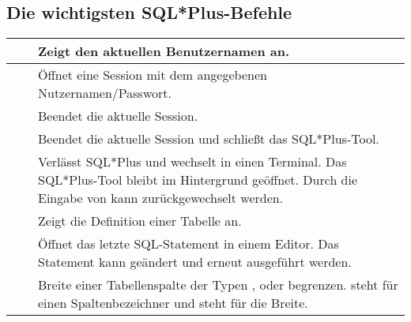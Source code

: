       \subsection{Die wichtigsten SQL*Plus-Befehle}
        \begin{center}
          \label{importantsqlpluscommands}
          \begin{small}
            \tabletail{
              \hline
            }
            \tablelasttail {
              \hline
            }
            \begin{supertabular}{|p{4.25cm}|p{4.25cm}|p{6.25cm}|}
               &  & Zeigt den aktuellen Benutzernamen an. \\
              \hline
               &  & \"Offnet eine Session mit dem angegebenen Nutzernamen/Passwort. \\
              \hline
               &  & Beendet die aktuelle Session. \\
              \hline
               &  & Beendet die aktuelle Session und schlie\ss{}t das SQL*Plus-Tool. \\
              \hline
               &  & Verl\"asst SQL*Plus und wechselt in einen Terminal. Das SQL*Plus-Tool bleibt im Hintergrund ge\"offnet. Durch die Eingabe von  kann zur\"uckgewechselt werden. \\
              \hline
               &  & Zeigt die Definition einer Tabelle an. \\
              \hline
               &  & \"Offnet das letzte SQL-Statement in einem Editor. Das Statement kann ge\"andert und erneut ausgef\"uhrt werden. \\
              \hline
               &  & Breite einer Tabellenspalte der Typen ,  oder  begrenzen.  steht f\"ur einen Spaltenbezeichner und  steht f\"ur die Breite. \\

\end{supertabular}
\end{small}
\end{center}
